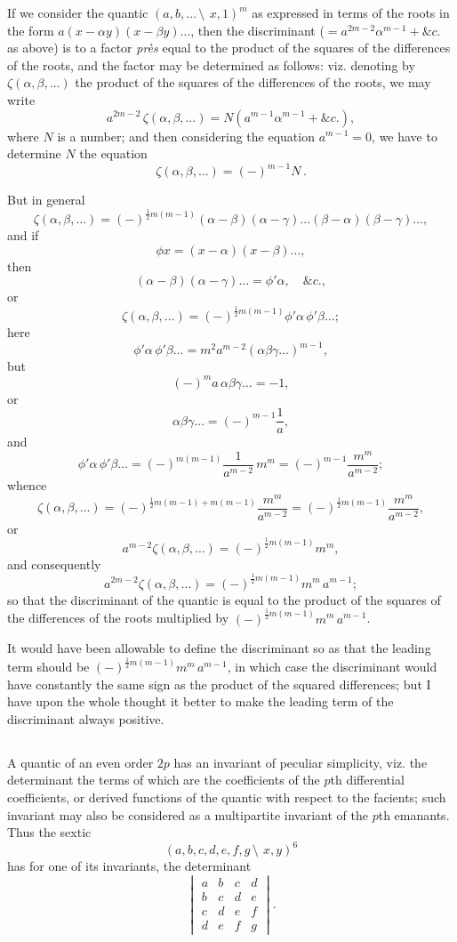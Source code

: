 \documentclass[11pt,a4paper]{book}
\begin{document}
\begin{center}
If we consider the quantic $(a, b, \ldots \,\setminus\!\!\:\, x, 1)^m$ as expressed in terms of the roots in the form $a(x - \alpha y)(x - \beta y)\ldots$, then the discriminant ($= a^{2m-2}\alpha^{m-1} + \&c.$ as above) is to a factor \textit{pr\`es} equal to the product of the squares of the differences of the roots, and the factor may be determined as follows: viz. denoting by $\zeta(\alpha, \beta, \ldots)$ the product of the squares of the differences of the roots, we may write
\[
a^{2m-2}\,\zeta(\alpha, \beta, \ldots) = N(a^{m-1}\alpha^{m-1} + \&c.),
\]
where $N$ is a number; and then considering the equation $a^{m-1} = 0$, we have to determine $N$ the equation
\[
\zeta(\alpha, \beta, \ldots) = (-)^{m-1}N\,.
\]

But in general
\[
\zeta(\alpha, \beta, \ldots) = (-)^{\frac{1}{2}m(m-1)}(\alpha - \beta)(\alpha - \gamma)\ldots(\beta - \alpha)(\beta - \gamma)\ldots,
\]
and if
\[
\phi x = (x - \alpha)(x - \beta)\ldots,
\]
then
\[
(\alpha - \beta)(\alpha - \gamma)\ldots = \phi'\alpha, \quad \&c.,
\]
or
\[
\zeta(\alpha, \beta, \ldots) = (-)^{\frac{1}{2}m(m-1)}\phi'\alpha\,\phi'\beta\ldots;
\]
here
\[
\phi'\alpha\,\phi'\beta\ldots = m^2 a^{m-2}(\alpha\beta\gamma\ldots)^{m-1},
\]
but
\[
(-)^m a\,\alpha\beta\gamma\ldots = -1,
\]
or
\[
\alpha\beta\gamma\ldots = (-)^{m-1}\frac{1}{a},
\]
and
\[
\phi'\alpha\,\phi'\beta\ldots = (-)^{m(m-1)}\frac{1}{a^{m-2}}\,m^m = (-)^{m-1}\frac{m^m}{a^{m-2}};
\]
whence
\[
\zeta(\alpha, \beta, \ldots) = (-)^{\frac{1}{2}m(m-1)+m(m-1)}\frac{m^m}{a^{m-2}} = (-)^{\frac{1}{2}m(m-1)}\frac{m^m}{a^{m-2}},
\]
or
\[
a^{m-2}\zeta(\alpha, \beta, \ldots) = (-)^{\frac{1}{2}m(m-1)}m^m,
\]
and consequently
\[
a^{2m-2}\zeta(\alpha, \beta, \ldots) = (-)^{\frac{1}{2}m(m-1)}m^m\,a^{m-1};
\]
so that the discriminant of the quantic is equal to the product of the squares of the differences of the roots multiplied by $(-)^{\frac{1}{2}m(m-1)}m^m\,a^{m-1}$.

It would have been allowable to define the discriminant so as that the leading term should be $(-)^{\frac{1}{2}m(m-1)}m^m\,a^{m-1}$, in which case the discriminant would have constantly the same sign as the product of the squared differences; but I have upon the whole thought it better to make the leading term of the discriminant always positive.

\subsection{}

A quantic of an even order $2p$ has an invariant of peculiar simplicity, viz. the determinant the terms of which are the coefficients of the $p$th differential coefficients, or derived functions of the quantic with respect to the facients; such invariant may also be considered as a multipartite invariant of the $p$th emanants. Thus the sextic
\[
(a, b, c, d, e, f, g\,\setminus\!\!\:\, x, y)^6
\]
has for one of its invariants, the determinant
\[
\begin{vmatrix}
a & b & c & d \\
b & c & d & e \\
c & d & e & f \\
d & e & f & g
\end{vmatrix}.
\]


\end{center}
\end{document}
